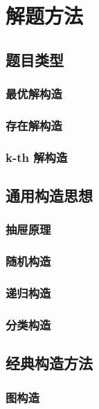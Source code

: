 \chapter{解题方法}

\section{题目类型}

\subsection{最优解构造}

\subsection{存在解构造}

\subsection{k-th 解构造}

\section{通用构造思想}

\subsection{抽屉原理}

\subsection{随机构造}

\subsection{递归构造}

\subsection{分类构造}

\section{经典构造方法}

\subsection{图构造}

